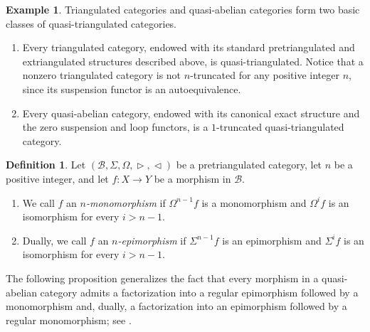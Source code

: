 \documentclass[a4paper,reqno,10pt]{amsart}
\theoremstyle{definition}
\newtheorem{definition}[definition]{Definition}
\theoremstyle{definition}
\theoremstyle{definition}
\theoremstyle{definition}
\newtheorem{example}[example]{Example}
\theoremstyle{plain}
\newcommand{\CB}{\mathcal{B}}
\begin{document}
\begin{example}\label{ex:quasi-tri_tri_abel}
Triangulated categories and quasi-abelian categories form two basic
classes of quasi-triangulated categories.
\begin{enumerate}
    \item Every triangulated category, endowed with its standard
    pretriangulated and extriangulated structures described above, is
    quasi-triangulated. Notice that a nonzero triangulated category is
    not $n$-truncated for any positive integer $n$, since its suspension
    functor is an autoequivalence.

    \item Every quasi-abelian category, endowed with its canonical exact
    structure \cite[Remark~1.1.11]{Sch99} and the zero suspension and
    loop functors, is a $1$-truncated quasi-triangulated category.
\end{enumerate}
\end{example}

\normalcolor

\begin{definition}
\label{def:n-mono_pretr}
Let $(\CB,\Sigma,\Omega,\vartriangleright,\vartriangleleft)$ be a
pretriangulated category, let $n$ be a positive integer, and let
$f\colon X\to Y$ be a morphism in $\CB$.
\begin{enumerate}
    \item We call $f$ an \emph{$n$-monomorphism} if $\Omega^{n-1}f$ is a
    monomorphism and $\Omega^i f$ is an isomorphism for every
    $i>n-1$.
    \item Dually, we call $f$ an \emph{$n$-epimorphism} if $\Sigma^{n-1}f$ is an
    epimorphism and $\Sigma^i f$ is an isomorphism for every
    $i>n-1$.
\end{enumerate}
\end{definition}

\color{blue}

The following proposition generalizes the fact that every morphism in
a quasi-abelian category admits a factorization into a regular
epimorphism followed by a monomorphism and, dually, a factorization
into an epimorphism followed by a regular monomorphism; see
\cite[Remark~1.1.2(b) and Proposition~1.1.4]{Sch99}.
\end{document}
